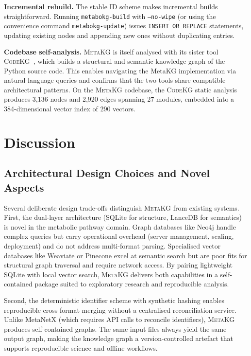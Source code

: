 \documentclass[10pt]{article}
\begin{document}
\textbf{Incremental rebuild.} The stable ID scheme makes incremental builds
straightforward. Running \texttt{metabokg-build} with \texttt{--no-wipe} (or using
the convenience command \texttt{metabokg-update}) issues \texttt{INSERT OR REPLACE}
statements, updating existing nodes and appending new ones without duplicating entries.

\textbf{Codebase self-analysis.} \textsc{MetaKG} is itself analysed with its
sister tool \textsc{CodeKG}~\citep{fluxfrontiers2025codekg}, which builds a
structural and semantic knowledge graph of the Python source code. This
enables navigating the MetaKG implementation via natural-language queries and
confirms that the two tools share compatible architectural patterns. On the
\textsc{MetaKG} codebase, the \textsc{CodeKG} static analysis produces 3,136
nodes and 2,920 edges spanning 27 modules, embedded into a 384-dimensional
vector index of 290 vectors.

\section{Discussion}
\label{sec:discussion}

\subsection{Architectural Design Choices and Novel Aspects}

Several deliberate design trade-offs distinguish \textsc{MetaKG} from existing
systems. First, the dual-layer architecture (SQLite for structure, LanceDB for
semantics) is novel in the metabolic pathway domain. Graph databases like
Neo4j handle complex queries but carry operational overhead (server
management, scaling, deployment) and do not address multi-format parsing.
Specialised vector databases like Weaviate or Pinecone excel at semantic
search but are poor fits for structural graph traversal and require network
access. By pairing lightweight SQLite with local vector search,
\textsc{MetaKG} delivers both capabilities in a self-contained package suited
to exploratory research and reproducible analysis.

Second, the deterministic identifier scheme with synthetic hashing enables
reproducible cross-format merging without a centralised reconciliation
service. Unlike MetaNetX (which requires API calls to reconcile identifiers),
\textsc{MetaKG} produces self-contained graphs. The same input files always
yield the same output graph, making the knowledge graph a version-controlled
artefact that supports reproducible science and offline workflows.
\end{document}
